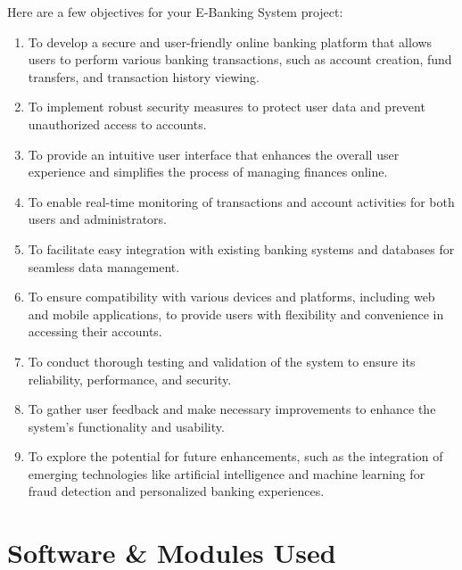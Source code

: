 \documentclass[12pt,a4paper]{report}
\begin{document}
Here are a few objectives for your E-Banking System project:
\begin{enumerate}
    \item To develop a secure and user-friendly online banking platform that allows users to
    perform various banking transactions, such as account creation, fund transfers, and
    transaction history viewing.
    \item To implement robust security measures to protect user data and prevent unauthorized
    access to accounts.
    \item To provide an intuitive user interface that enhances the overall user experience and
    simplifies the process of managing finances online.
    \item To enable real-time monitoring of transactions and account activities for both users
    and administrators.
    \item To facilitate easy integration with existing banking systems and databases for
    seamless data management.
    \item To ensure compatibility with various devices and platforms, including web and
    mobile applications, to provide users with flexibility and convenience in accessing their
    accounts.
    \item To conduct thorough testing and validation of the system to ensure its reliability,
    performance, and security.
    \item To gather user feedback and make necessary improvements to enhance the system's
    functionality and usability.
    \item To explore the potential for future enhancements, such as the integration of
    emerging technologies like artificial intelligence and machine learning for fraud detection
    and personalized banking experiences.
\end{enumerate}


\chapter{Software \& Modules Used}
\end{document}
